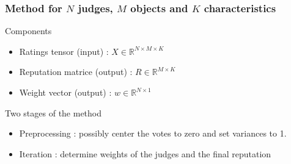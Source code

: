 \begin{frame}
\frametitle{Method for $N$ judges, $M$ objects and $K$ characteristics}
\begin{block}{Components}
\begin{itemize}
\item Ratings tensor (input) : $X \in \mathbb{R}^{N\times M \times K}$
\item Reputation matrice (output) : $R \in \mathbb{R}^{M\times K}$
\item Weight vector (output) : $w \in \mathbb{R}^{N\times 1}$
\end{itemize}
\end{block}
\begin{block}{Two stages of the method}
\begin{itemize}
\item Preprocessing : possibly center the votes to zero and set variances to 1.
\item Iteration : determine weights of the judges and the final reputation
\end{itemize}
\end{block}
\end{frame}

